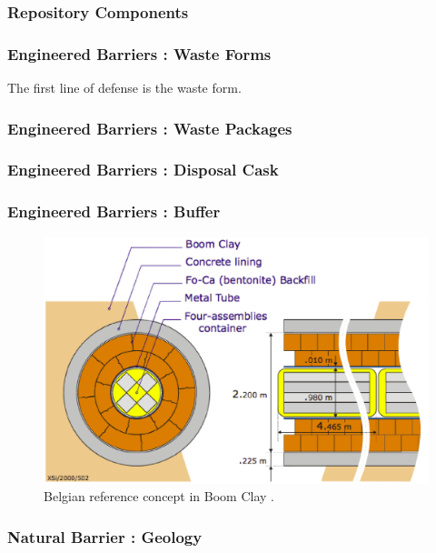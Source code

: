 

\begin{frame}[ctb!]
  \frametitle{Repository Components}
\footnotesize{
  
}
\end{frame}

\begin{frame}[ctb!]
  \frametitle{Engineered Barriers : Waste Forms}
\footnotesize{
  The first line of defense is the waste form.
  
}
\end{frame}

\begin{frame}[ctb!]
  \frametitle{Engineered Barriers : Waste Packages}
\footnotesize{
  
}
\end{frame}

\begin{frame}[ctb!]
  \frametitle{Engineered Barriers : Disposal Cask}
\footnotesize{
  
}
\end{frame}

\begin{frame}[ctb!]
  \frametitle{Engineered Barriers : Buffer}
\footnotesize{
  \begin{figure}[h!]
    \begin{center}
      \includegraphics[height=.7\textheight]{./images/belgianClayRedImp.eps}
    \end{center}
    \caption{Belgian reference concept in Boom Clay 
    \cite{von_lensa_red-impact_2008}.}
    \label{fig:belgianClayRedImp}
  \end{figure}
}
\end{frame}

\begin{frame}[ctb!]
  \frametitle{Natural Barrier : Geology}
\footnotesize{
  
}
\end{frame}
